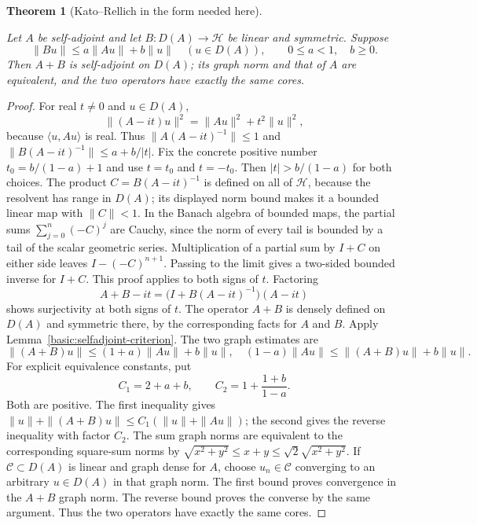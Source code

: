 \documentclass[11pt,a4paper]{article}
\newtheorem{theorem}{Theorem}[section]
\theoremstyle{definition}
\theoremstyle{remark}
\newcommand{\proofid}[1]{\par\smallskip{\normalfont\scriptsize\color{inkblue}Stable ID: \nolinkurl{#1}}\par\smallskip}
\begin{document}
\begin{theorem}[Kato--Rellich in the form needed here]
\label{basic:kato-rellich}
\proofid{basic:kato-rellich}
\par{}\par\smallskip

Let $A$ be self-adjoint and let $B:D(A)\to\mathcal H$ be linear
and symmetric.
Suppose
\[
 \|Bu\|\leq a\|Au\|+b\|u\|\quad(u\in D(A)),\qquad 0\leq a<1,
 \quad b\geq0.
\]
Then $A+B$ is self-adjoint on $D(A)$; its graph norm and that of $A$
are equivalent, and the two operators have exactly the same cores.
\end{theorem}
\begin{proof}
For real $t\ne0$ and $u\in D(A)$,
\[
 \|(A-it)u\|^2=\|Au\|^2+t^2\|u\|^2,
\]
because $\langle u,Au\rangle$ is real. Thus
$\|A(A-it)^{-1}\|\leq1$ and
$\|B(A-it)^{-1}\|\leq a+b/|t|$. Fix the concrete positive
number $t_0=b/(1-a)+1$ and use $t=t_0$ and $t=-t_0$.
Then $|t|>b/(1-a)$ for both choices.
The product $C=B(A-it)^{-1}$ is defined on all of $\mathcal H$,
because the resolvent has range in $D(A)$; its displayed norm bound
makes it a bounded linear map with $\|C\|<1$. In the Banach algebra
of bounded maps, the partial sums $\sum_{j=0}^n(-C)^j$ are Cauchy,
since the norm of every tail is bounded by a tail of the scalar
geometric series. Multiplication of a partial sum by $I+C$ on either
side leaves $I-(-C)^{n+1}$. Passing to the limit gives a two-sided
bounded inverse for $I+C$. This proof applies to both signs of $t$.
Factoring
\[
 A+B-it=\bigl(I+B(A-it)^{-1}\bigr)(A-it)
\]
shows surjectivity at both signs of $t$. The operator $A+B$ is densely defined on $D(A)$ and symmetric there, by the corresponding facts for $A$ and $B$. Apply
Lemma~\ref{basic:selfadjoint-criterion}.
The two graph estimates are
\[
 \|(A+B)u\|\leq(1+a)\|Au\|+b\|u\|,\quad
 (1-a)\|Au\|\leq\|(A+B)u\|+b\|u\|.
\]
For explicit equivalence constants, put
\[
 C_1=2+a+b,\qquad C_2=1+\frac{1+b}{1-a}.
\]
Both are positive. The first inequality gives
$\|u\|+\|(A+B)u\|\leq C_1(\|u\|+\|Au\|)$;
the second gives the reverse inequality with factor $C_2$.
The sum graph norms are equivalent to the corresponding square-sum
norms by $\sqrt{x^2+y^2}\leq x+y\leq\sqrt2\sqrt{x^2+y^2}$.
If $\mathcal C\subset D(A)$ is linear and graph dense for $A$,
choose $u_n\in\mathcal C$ converging to an arbitrary $u\in D(A)$
in that graph norm. The first bound proves convergence in the
$A+B$ graph norm. The reverse bound proves the converse by the
same argument. Thus the two operators have exactly the same cores.
\end{proof}
\end{document}
